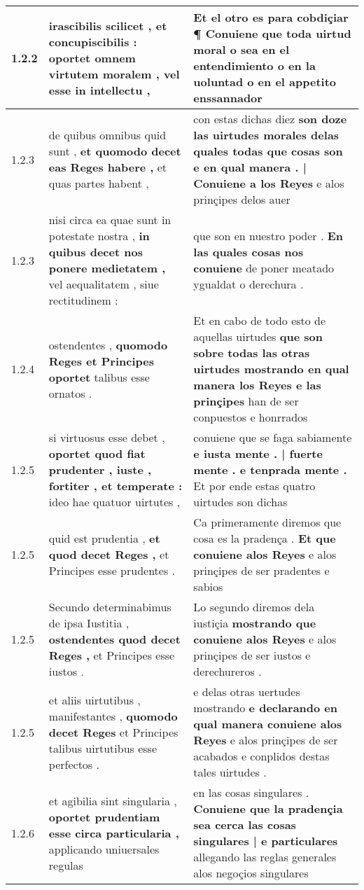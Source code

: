 \begin{tabular}{|p{1cm}|p{6.5cm}|p{6.5cm}|}
1.2.2 & irascibilis scilicet , et concupiscibilis : \textbf{ oportet omnem virtutem moralem , } vel esse in intellectu , & Et el otro es para cobdiçiar \textbf{ ¶ Conuiene que toda uirtud moral } o sea en el entendimiento o en la uoluntad o en el appetito enssannador \\\hline
1.2.3 & de quibus omnibus quid sunt , \textbf{ et quomodo decet eas Reges habere , } et quas partes habent , & con estas dichas diez \textbf{ son doze las uirtudes morales delas quales todas que cosas son e en qual manera . | Conuiene a los Reyes } e alos prinçipes delos auer \\\hline
1.2.3 & nisi circa ea quae sunt in potestate nostra , \textbf{ in quibus decet nos ponere medietatem , } vel aequalitatem , siue rectitudinem : & que son en nuestro poder . \textbf{ En las quales cosas nos conuiene } de poner meatado ygualdat o derechura . \\\hline
1.2.4 & ostendentes , \textbf{ quomodo Reges et Principes oportet } talibus esse ornatos . & Et en cabo de todo esto de aquellas uirtudes \textbf{ que son sobre todas las otras uirtudes mostrando en qual manera los Reyes e las prinçipes } han de ser conpuestos e honrrados \\\hline
1.2.5 & si virtuosus esse debet , \textbf{ oportet quod fiat prudenter , iuste , fortiter , et temperate : } ideo hae quatuor uirtutes , & conuiene que se faga sabiamente \textbf{ e iusta mente . | fuerte mente . e tenprada mente . } Et por ende estas quatro uirtudes son dichas \\\hline
1.2.5 & quid est prudentia , \textbf{ et quod decet Reges , } et Principes esse prudentes . & Ca primeramente diremos que cosa es la pradença . \textbf{ Et que conuiene alos Reyes } e alos prinçipes de ser pradentes e sabios \\\hline
1.2.5 & Secundo determinabimus de ipsa Iustitia , \textbf{ ostendentes quod decet Reges , } et Principes esse iustos . & Lo segundo diremos dela iustiçia \textbf{ mostrando que conuiene alos Reyes } e alos prinçipes de ser iustos e derechureros . \\\hline
1.2.5 & et aliis uirtutibus , manifestantes , \textbf{ quomodo decet Reges } et Principes talibus uirtutibus esse perfectos . & e delas otras uertudes mostrando \textbf{ e declarando en qual manera conuiene alos Reyes } e alos prinçipes de ser acabados e conplidos destas tales uirtudes . \\\hline
1.2.6 & et agibilia sint singularia , \textbf{ oportet prudentiam esse circa particularia , } applicando uniuersales regulas & en las cosas singulares . \textbf{ Conuiene que la pradençia sea cerca las cosas singulares | e particulares } allegando las reglas generales alos negoçios singulares \\\hline

\end{tabular}

